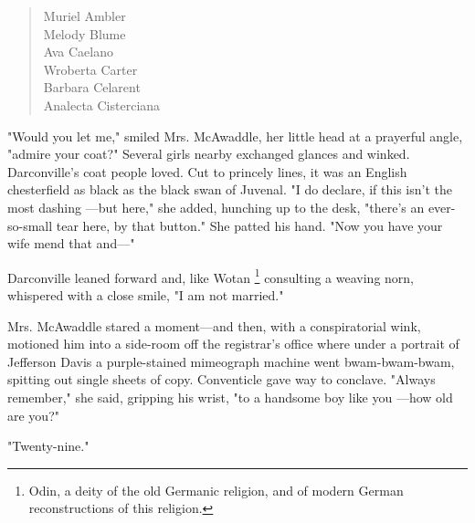 \begin{verse}
        \hspace{6em} Muriel Ambler  \\
        \hspace{6em} Melody Blume   \\
        \hspace{6em} Ava Caelano    \\
        \hspace{6em} Wroberta Carter    \\
        \hspace{6em} Barbara Celarent   \\
        \hspace{6em} Analecta Cisterciana
\end{verse}
 
  "Would you let me," smiled Mrs. McAwaddle, her little head at a prayerful
angle, "admire your coat?" Several girls nearby exchanged glances and winked.
Darconville's coat people loved. Cut to princely lines, it was an English
chesterfield 
as black as the black swan of Juvenal. "I do declare, if this isn't
the most dashing
---but here," she added, hunching up to the desk, "there's an
ever-so-small tear here, by that button." She patted his hand. "Now you have
your wife mend 
that and---"

  Darconville leaned forward and, like Wotan 
\footnote{ Odin, a deity of the old Germanic religion, and of modern German
reconstructions of this religion.}
consulting a weaving norn, 
whispered with a close smile, "I am not married."

  Mrs. McAwaddle stared a moment---and then, with a conspiratorial 
wink, motioned him into a side-room off the registrar's office where under a 
portrait of Jefferson Davis a purple-stained mimeograph 
machine went bwam-bwam-bwam, spitting out single sheets of copy. Conventicle 
gave way to conclave. 
"Always remember," she said, gripping his wrist, "to a handsome boy like you
---how old are you?"

  "Twenty-nine."

